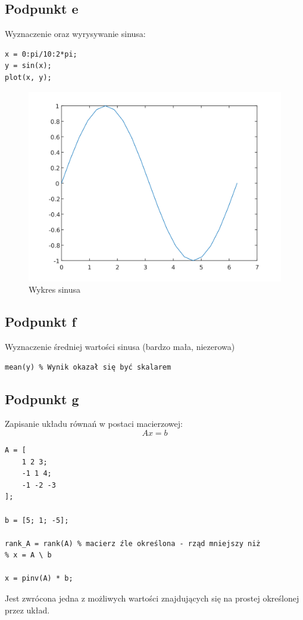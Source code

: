 \documentclass[a4paper, 12pt, titlepage]{article}
\begin{document}
        \subsection{Podpunkt e}
            Wyznaczenie oraz wyrysywanie sinusa:
\begin{lstlisting}
x = 0:pi/10:2*pi;
y = sin(x);
plot(x, y);
\end{lstlisting}
        \begin{figure}[H]
            \centering
            \includegraphics[width=0.8\columnwidth]{sinus.png}
            \caption{Wykres sinusa}
        \end{figure}\noindent

        \subsection{Podpunkt f}
            Wyznaczenie średniej wartości sinusa (bardzo mała, niezerowa)
\begin{lstlisting}
mean(y) % Wynik okazał się być skalarem
\end{lstlisting}
        \subsection{Podpunkt g}
            Zapisanie układu równań w postaci macierzowej:
            $$
                Ax = b
            $$
\begin{lstlisting}
A = [
    1 2 3;
    -1 1 4;
    -1 -2 -3
];

b = [5; 1; -5];

rank_A = rank(A) % macierz źle określona - rząd mniejszy niż 
% x = A \ b

x = pinv(A) * b;
\end{lstlisting}
            Jest zwrócona jedna z możliwych wartości znajdujących się na
            prostej określonej przez układ.
\end{document}
